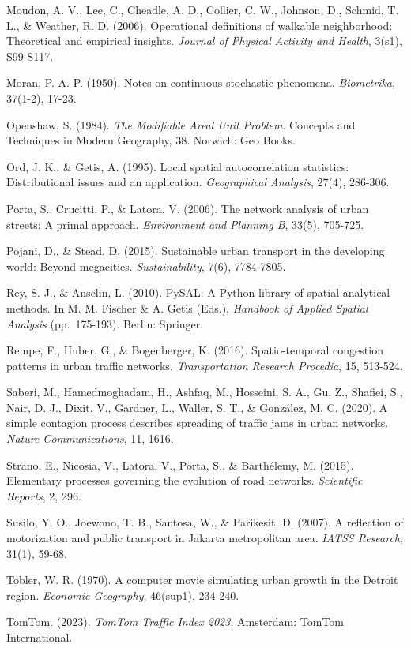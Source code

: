 \documentclass[12pt,a4paper]{article}
\begin{document}
Moudon, A. V., Lee, C., Cheadle, A. D., Collier, C. W., Johnson, D., Schmid, T. L., \& Weather, R. D. (2006). Operational definitions of walkable neighborhood: Theoretical and empirical insights. \emph{Journal of Physical Activity and Health}, 3(s1), S99-S117.

Moran, P. A. P. (1950). Notes on continuous stochastic phenomena. \emph{Biometrika}, 37(1-2), 17-23.

Openshaw, S. (1984). \emph{The Modifiable Areal Unit Problem}. Concepts and Techniques in Modern Geography, 38. Norwich: Geo Books.

Ord, J. K., \& Getis, A. (1995). Local spatial autocorrelation statistics: Distributional issues and an application. \emph{Geographical Analysis}, 27(4), 286-306.

Porta, S., Crucitti, P., \& Latora, V. (2006). The network analysis of urban streets: A primal approach. \emph{Environment and Planning B}, 33(5), 705-725.

Pojani, D., \& Stead, D. (2015). Sustainable urban transport in the developing world: Beyond megacities. \emph{Sustainability}, 7(6), 7784-7805.

Rey, S. J., \& Anselin, L. (2010). PySAL: A Python library of spatial analytical methods. In M. M. Fischer \& A. Getis (Eds.), \emph{Handbook of Applied Spatial Analysis} (pp.~175-193). Berlin: Springer.

Rempe, F., Huber, G., \& Bogenberger, K. (2016). Spatio-temporal congestion patterns in urban traffic networks. \emph{Transportation Research Procedia}, 15, 513-524.

Saberi, M., Hamedmoghadam, H., Ashfaq, M., Hosseini, S. A., Gu, Z., Shafiei, S., Nair, D. J., Dixit, V., Gardner, L., Waller, S. T., \& González, M. C. (2020). A simple contagion process describes spreading of traffic jams in urban networks. \emph{Nature Communications}, 11, 1616.

Strano, E., Nicosia, V., Latora, V., Porta, S., \& Barthélemy, M. (2015). Elementary processes governing the evolution of road networks. \emph{Scientific Reports}, 2, 296.

Susilo, Y. O., Joewono, T. B., Santosa, W., \& Parikesit, D. (2007). A reflection of motorization and public transport in Jakarta metropolitan area. \emph{IATSS Research}, 31(1), 59-68.

Tobler, W. R. (1970). A computer movie simulating urban growth in the Detroit region. \emph{Economic Geography}, 46(sup1), 234-240.

TomTom. (2023). \emph{TomTom Traffic Index 2023}. Amsterdam: TomTom International.
\end{document}
